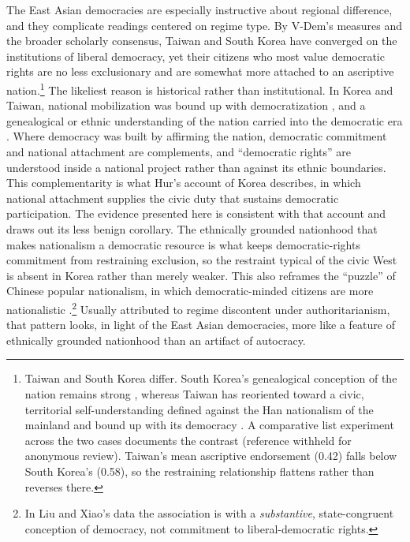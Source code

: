 The East Asian democracies are especially instructive about regional difference, and they complicate readings centered on regime type. By V-Dem's measures and the broader scholarly consensus, Taiwan and South Korea have converged on the institutions of liberal democracy, yet their citizens who most value democratic rights are no less exclusionary and are somewhat more attached to an ascriptive nation.\footnote{Taiwan and South Korea differ. South Korea's genealogical conception of the nation remains strong \citep{hur2022narratives, jo2024nations}, whereas Taiwan has reoriented toward a civic, territorial self-understanding defined against the Han nationalism of the mainland and bound up with its democracy \citep{wachman1994taiwan, ho2022desinicizing}. A comparative list experiment across the two cases documents the contrast \ifanon(reference withheld for anonymous review)\else\citep{denney2026conformity}\fi. Taiwan's mean ascriptive endorsement (0.42) falls below South Korea's (0.58), so the restraining relationship flattens rather than reverses there.} The likeliest reason is historical rather than institutional. In Korea and Taiwan, national mobilization was bound up with democratization \citep{shin2006, chu2004}, and a genealogical or ethnic understanding of the nation carried into the democratic era \citep{shin2006}. Where democracy was built by affirming the nation, democratic commitment and national attachment are complements, and ``democratic rights'' are understood inside a national project rather than against its ethnic boundaries. This complementarity is what Hur's \citeyearpar{hur2022narratives, hur2026democratic} account of Korea describes, in which national attachment supplies the civic duty that sustains democratic participation. The evidence presented here is consistent with that account and draws out its less benign corollary. The ethnically grounded nationhood that makes nationalism a democratic resource is what keeps democratic-rights commitment from restraining exclusion, so the restraint typical of the civic West is absent in Korea rather than merely weaker. This also reframes the ``puzzle'' of Chinese popular nationalism, in which democratic-minded citizens are more nationalistic \citep{zhong2020, liu2026}.\footnote{In Liu and Xiao's data the association is with a \emph{substantive}, state-congruent conception of democracy, not commitment to liberal-democratic rights.} Usually attributed to regime discontent under authoritarianism, that pattern looks, in light of the East Asian democracies, more like a feature of ethnically grounded nationhood than an artifact of autocracy.


